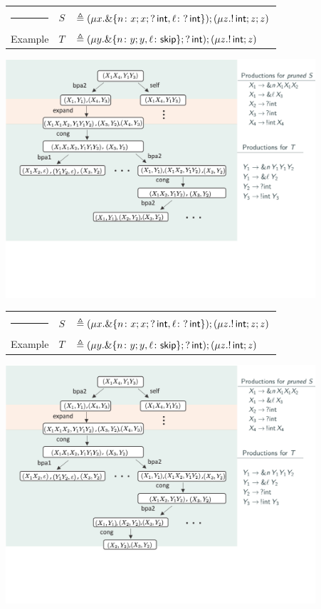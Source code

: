 \documentclass[10pt]{beamer}
\begin{document}
\begin{frame}
	\begin{tabular} {l l l }
  		{\color{teal}\rule{3cm}{2pt}} &  $S$ &$\triangleq (\mu x. \&\{n\colon x;x;?\,\mathsf{int},
      \ell\colon ?\,\mathsf{int} \});( \mu z. !\,\mathsf{int}; z;z )$\\
  		{\color{teal} Example}  &  $T$ &$\triangleq (\mu y. \&\{n\colon y;y,
      \ell\colon \mathsf{skip} \}; ?\,\mathsf{int}); (\mu z. !\,\mathsf{int}; z)$
	\end{tabular}
	\vspace*{2mm}
	\includegraphics[width=11.5cm]{img/exemplo-3}\smallskip
\end{frame}

\begin{frame}
	\begin{tabular} {l l l }
  		{\color{teal}\rule{3cm}{2pt}} &  $S$ &$\triangleq (\mu x. \&\{n\colon x;x;?\,\mathsf{int},
      \ell\colon ?\,\mathsf{int} \});( \mu z. !\,\mathsf{int}; z;z )$\\
  		{\color{teal} Example}  &  $T$ &$\triangleq (\mu y. \&\{n\colon y;y,
      \ell\colon \mathsf{skip} \}; ?\,\mathsf{int}); (\mu z. !\,\mathsf{int}; z)$
	\end{tabular}
	\vspace*{2mm}
	\includegraphics[width=11.5cm]{img/exemplo-2}\smallskip
\end{frame}
\end{document}
